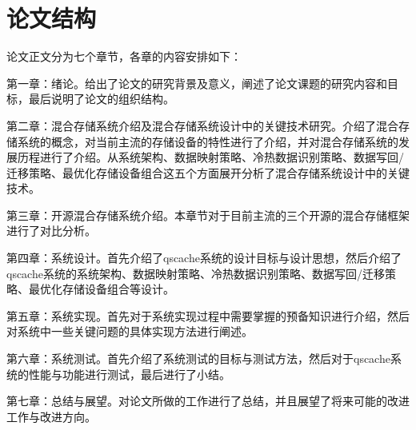 \section{论文结构}

论文正文分为七个章节，各章的内容安排如下： 

第一章：绪论。给出了论文的研究背景及意义，阐述了论文课题的研究内容和目标，最后说明了论文的组织结构。 

第二章：混合存储系统介绍及混合存储系统设计中的关键技术研究。介绍了混合存储系统的概念，对当前主流的存储设备的特性进行了介绍，并对混合存储系统的发展历程进行了介绍。从系统架构、数据映射策略、冷热数据识别策略、数据写回/迁移策略、最优化存储设备组合这五个方面展开分析了混合存储系统设计中的关键技术。

第三章：开源混合存储系统介绍。本章节对于目前主流的三个开源的混合存储框架进行了对比分析。

第四章：系统设计。首先介绍了qscache系统的设计目标与设计思想，然后介绍了qscache系统的系统架构、数据映射策略、冷热数据识别策略、数据写回/迁移策略、最优化存储设备组合等设计。 

第五章：系统实现。首先对于系统实现过程中需要掌握的预备知识进行介绍，然后对系统中一些关键问题的具体实现方法进行阐述。 

第六章：系统测试。首先介绍了系统测试的目标与测试方法，然后对于qscache系统的性能与功能进行测试，最后进行了小结。 

第七章：总结与展望。对论文所做的工作进行了总结，并且展望了将来可能的改进工作与改进方向。

